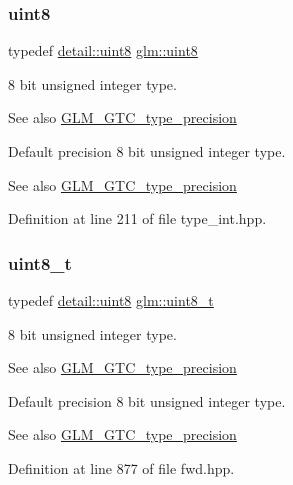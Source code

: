 \subsubsection{\texorpdfstring{uint8}{uint8}}
{\footnotesize\ttfamily typedef \mbox{\hyperlink{namespaceglm_1_1detail_aef2588f97d090cc19fbbe0c74fe17c8f}{detail\+::uint8}} \mbox{\hyperlink{group__gtc__type__precision_ga1a7dcd8aac97cc8020817c94049deff2}{glm\+::uint8}}}

8 bit unsigned integer type. \begin{DoxySeeAlso}{See also}
\mbox{\hyperlink{group__gtc__type__precision}{G\+L\+M\+\_\+\+G\+T\+C\+\_\+type\+\_\+precision}}
\end{DoxySeeAlso}
Default precision 8 bit unsigned integer type. \begin{DoxySeeAlso}{See also}
\mbox{\hyperlink{group__gtc__type__precision}{G\+L\+M\+\_\+\+G\+T\+C\+\_\+type\+\_\+precision}} 
\end{DoxySeeAlso}


Definition at line 211 of file type\+\_\+int.\+hpp.

\mbox{\label{group__gtc__type__precision_ga93adf6dd9803408f3e3aaf9dedda352b}} 
\subsubsection{\texorpdfstring{uint8\_t}{uint8\_t}}
{\footnotesize\ttfamily typedef \mbox{\hyperlink{namespaceglm_1_1detail_aef2588f97d090cc19fbbe0c74fe17c8f}{detail\+::uint8}} \mbox{\hyperlink{group__gtc__type__precision_ga93adf6dd9803408f3e3aaf9dedda352b}{glm\+::uint8\+\_\+t}}}

8 bit unsigned integer type. \begin{DoxySeeAlso}{See also}
\mbox{\hyperlink{group__gtc__type__precision}{G\+L\+M\+\_\+\+G\+T\+C\+\_\+type\+\_\+precision}}
\end{DoxySeeAlso}
Default precision 8 bit unsigned integer type. \begin{DoxySeeAlso}{See also}
\mbox{\hyperlink{group__gtc__type__precision}{G\+L\+M\+\_\+\+G\+T\+C\+\_\+type\+\_\+precision}} 
\end{DoxySeeAlso}


Definition at line 877 of file fwd.\+hpp.

